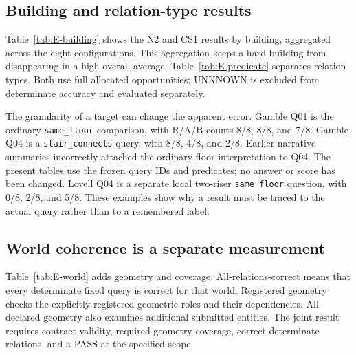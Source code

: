 \subsection{Building and relation-type results}
Table~\ref{tab:E-building} shows the N2 and CS1 results by building, aggregated across the eight configurations. This aggregation keeps a hard building from disappearing in a high overall average. Table~\ref{tab:E-predicate} separates relation types. Both use full allocated opportunities; UNKNOWN is excluded from determinate accuracy and evaluated separately.

\begin{table}[htbp]\centering\small

\caption{Correct readouts by building and route, pooling eight fixed configurations within each row. These are repeated measurements on a building, not independent buildings.}\label{tab:E-building}
\end{table}

\begin{table}[htbp]\centering\small

\caption{Determinate readouts by predicate. Differences combine relation difficulty, the available drawings, representation support, and delivery reliability.}\label{tab:E-predicate}
\end{table}

The granularity of a target can change the apparent error. Gamble Q01 is the ordinary \texttt{same\_floor} comparison, with R/A/B counts 8/8, 8/8, and 7/8. Gamble Q04 is a \texttt{stair\_connects} query, with 8/8, 4/8, and 2/8. Earlier narrative summaries incorrectly attached the ordinary-floor interpretation to Q04. The present tables use the frozen query IDs and predicates; no answer or score has been changed. Lovell Q04 is a separate local two-riser \texttt{same\_floor} question, with 0/8, 2/8, and 5/8. These examples show why a result must be traced to the actual query rather than to a remembered label.

\subsection{World coherence is a separate measurement}
Table~\ref{tab:E-world} adds geometry and coverage. All-relations-correct means that every determinate fixed query is correct for that world. Registered geometry checks the explicitly registered geometric roles and their dependencies. All-declared geometry also examines additional submitted entities. The joint result requires contract validity, required geometry coverage, correct determinate relations, and a PASS at the specified scope.

